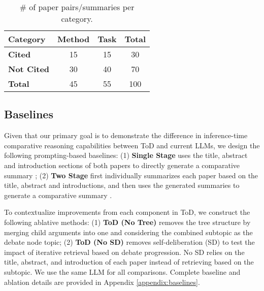 \begin{table}[h!]
    \footnotesize
    \centering
    \begin{tabular}{l|cc|c}
        \toprule
         \textbf{Category} & \textbf{Method} & \textbf{Task} & \textbf{Total}\\
         \midrule
         \textbf{Cited} & 15 & 15 & 30 \\
         \textbf{Not Cited} & 30 & 40 & 70 \\
         \midrule
         \textbf{Total} & 45 & 55 & 100 \\
         \bottomrule
    \end{tabular}
    \caption{\# of paper pairs/summaries per category.}
    \label{tab:dataset}
    \vspace{-0.5cm}
\end{table}

\subsection{Baselines}
\label{sec:baselines}
\par Given that our primary goal is to demonstrate the difference in inference-time comparative reasoning capabilities between ToD and current LLMs, we design the following prompting-based baselines: (1) \textbf{Single Stage} uses the title, abstract and introduction sections of both papers to directly generate a comparative summary \cite{MartinBoyle2024ShallowSO}; (2) \textbf{Two Stage} first individually summarizes each paper based on the title, abstract and introductions, and then uses the generated summaries to generate a comparative summary \cite{Zhang2024FromCT}.

\par To contextualize improvements from each component in ToD, we construct the following ablative methods: (1) \textbf{ToD (No Tree)} removes the tree structure by merging child arguments into one and considering the combined subtopic as the debate node topic; (2) \textbf{ToD (No SD)} removes self-deliberation (SD) to test the impact of iterative retrieval based on debate progression. No SD relies on the title, abstract, and introduction of each paper instead of retrieving based on the subtopic. We use the same LLM for all comparisons. Complete baseline and ablation details are provided in Appendix \ref{appendix:baselines}.

